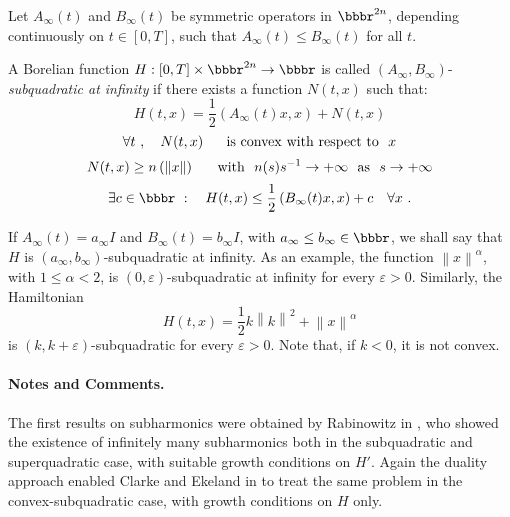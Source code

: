 \documentclass{llncs}
\begin{document}
    \begin{definition}
    Let $A_{\infty} (t)$ and $B_{\infty} (t)$ be symmetric
    operators in $\bbbr^{2n}$, depending continuously on
    $t\in [0,T]$, such that
    $A_{\infty} (t) \le B_{\infty} (t)$ for all $t$.
    
    A Borelian function
    $H: [0,T]\times \bbbr^{2n} \to \bbbr$
    is called
    $\left(A_{\infty} ,B_{\infty}\right)$-{\it subquadratic at infinity}
    if there exists a function $N(t,x)$ such that:
    \begin{equation}
      H (t,x) = \frac{1}{2} \left(A_{\infty} (t) x,x\right) + N(t,x)
    \end{equation}
    \begin{equation}
      \forall t\ ,\ \ \ N(t,x)\ \ \ \ \
      {\rm is\ convex\ with\  respect\  to}\ \ x
    \end{equation}
    \begin{equation}
      N(t,x) \ge n\left(\left\|x\right\|\right)\ \ \ \ \
      {\rm with}\ \ n(s)s^{-1}\to +\infty\ \ {\rm as}\ \ s\to +\infty
    \end{equation}
    \begin{equation}
      \exists c\in \bbbr\ :\ \ \ H (t,x) \le
      \frac{1}{2} \left(B_{\infty} (t) x,x\right) + c\ \ \ \forall x\ .
    \end{equation}
    
    If $A_{\infty} (t) = a_{\infty} I$ and
    $B_{\infty} (t) = b_{\infty} I$, with
    $a_{\infty} \le b_{\infty} \in \bbbr$,
    we shall say that $H$ is
    $\left(a_{\infty},b_{\infty}\right)$-subquadratic
    at infinity. As an example, the function
    $\left\|x\right\|^{\alpha}$, with
    $1\le \alpha < 2$, is $(0,\varepsilon )$-subquadratic at infinity
    for every $\varepsilon > 0$. Similarly, the Hamiltonian
    \begin{equation}
    H (t,x) = \frac{1}{2} k \left\|k\right\|^{2} +\left\|x\right\|^{\alpha}
    \end{equation}
    is $(k,k+\varepsilon )$-subquadratic for every $\varepsilon > 0$.
    Note that, if $k<0$, it is not convex.
    \end{definition}
    
    \paragraph{Notes and Comments.}
    The first results on subharmonics were
    obtained by Rabinowitz in \cite{2rab}, who showed the existence of
    infinitely many subharmonics both in the subquadratic and superquadratic
    case, with suitable growth conditions on $H'$. Again the duality
    approach enabled Clarke and Ekeland in \cite{2clar:eke:2} to treat the
    same problem in the convex-subquadratic case, with growth conditions on
    $H$ only.
    
\end{document}
